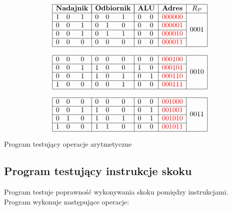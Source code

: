 \documentclass[../main.tex]{subfiles}
\begin{document}
    \begin{table}[ht]
        \[
        \begin{array}{|ccc|ccc|cc|c|c|}
        \hline
        \multicolumn{3}{|c|}{\textbf{Nadajnik}} & \multicolumn{3}{|c|}{\textbf{Odbiornik}}
        & \multicolumn{2}{|c|}{\textbf{ALU}} & \textbf{Adres} & \textbf{$R_P$} \\ \hline
        1 & 0 & 1 & 0 & 0 & 1 & 0 & 0 & \textcolor{red}{0000 00} & \multirow{4}{*}{0001} \\ \cline{1-9}
        0 & 0 & 1 & 0 & 1 & 0 & 0 & 0 & \textcolor{red}{0000 01} & \\ \cline{1-9}
        0 & 0 & 1 & 0 & 1 & 1 & 0 & 0 & \textcolor{red}{0000 10} & \\ \cline{1-9}
        0 & 0 & 0 & 0 & 0 & 0 & 0 & 0 & \textcolor{red}{0000 11} & \\ \hline
        \multicolumn{5}{c}{} \\ \hline
        0 & 0 & 0 & 0 & 0 & 0 & 0 & 0 & \textcolor{red}{0001 00} & \multirow{4}{*}{0010} \\ \cline{1-9}
        0 & 0 & 1 & 1 & 0 & 0 & 1 & 0 & \textcolor{red}{0001 01} & \\ \cline{1-9}
        0 & 0 & 1 & 1 & 0 & 1 & 0 & 1 & \textcolor{red}{0001 10} & \\ \cline{1-9}
        1 & 0 & 0 & 0 & 0 & 1 & 0 & 0 & \textcolor{red}{0001 11} & \\ \hline
        \multicolumn{5}{c}{} \\ \hline
        0 & 0 & 0 & 0 & 0 & 0 & 0 & 0 & \textcolor{red}{0010 00} & \multirow{4}{*}{0011} \\ \cline{1-9}
        0 & 0 & 1 & 1 & 0 & 0 & 0 & 1 & \textcolor{red}{0010 01} &  \\ \cline{1-9}
        0 & 1 & 0 & 1 & 0 & 1 & 0 & 1 & \textcolor{red}{0010 10} & \\ \cline{1-9}
        1 & 0 & 0 & 1 & 1 & 0 & 0 & 0 & \textcolor{red}{0010 11} & \\ \hline
        \end{array}
        \]
        \caption{Program testujący operacje arytmetyczne}
    \end{table}

\subsection{Program testujący instrukcje skoku}

    Program testuje poprawność wykonywania skoku pomiędzy instrukcjami. Program wykonuje następujące operacje:
\end{document}
